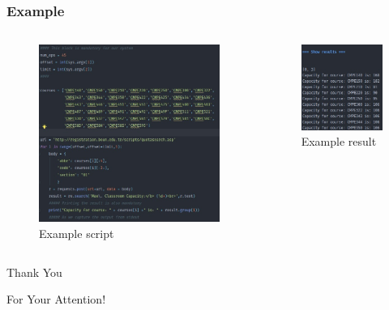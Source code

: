 \documentclass{beamer}
\begin{document}
\begin{frame}
\frametitle{Example }
\begin{columns}[c] %

\begin{figure}
\includegraphics[width=1\linewidth]{example_script.jpeg}
\caption{Example script}
\end{figure}

\begin{figure}
\includegraphics[width=0.93\linewidth]{example_results.jpeg}
\caption{Example result}
\end{figure}
\end{columns}
\end{frame}


\begin{frame}
\Huge{\centerline{Thank You}}
\Huge{\centerline{For Your Attention!}}
\end{frame}

\end{document}
